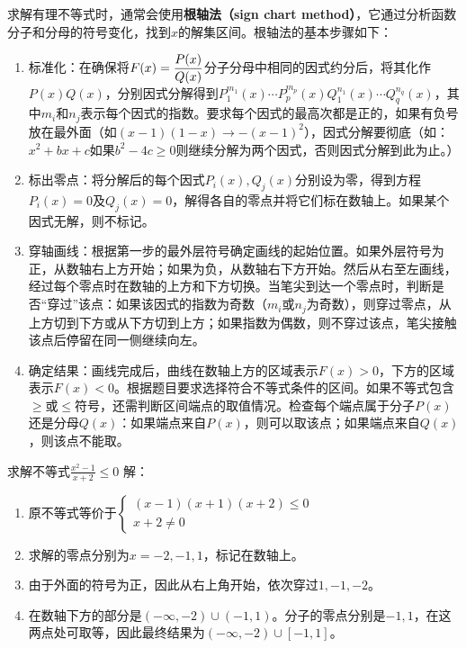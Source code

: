 求解有理不等式时，通常会使用\textbf{根轴法（sign chart method）}，它通过分析函数分子和分母的符号变化，找到$x$的解集区间。根轴法的基本步骤如下：
\begin{enumerate}
\item 标准化：在确保将$\displaystyle F(x)={P(x)\over Q(x)}$分子分母中相同的因式约分后，将其化作$P(x)Q(x)$，分别因式分解得到$P^{m_1}_1(x)\cdots P^{m_p}_p(x)Q^{n_1}_1(x)\cdots Q^{n_q}_q(x)$，其中$m_i$和$n_j$表示每个因式的指数。要求每个因式的最高次都是正的，如果有负号放在最外面（如$(x-1)(1-x)\to-(x-1)^2$），因式分解要彻底（如：$x^2+bx+c$如果$b^2-4c\geq0$则继续分解为两个因式，否则因式分解到此为止。）
\item 标出零点：将分解后的每个因式$P_i(x),Q_j(x)$分别设为零，得到方程$P_i(x) = 0$及$Q_j(x) = 0$，解得各自的零点并将它们标在数轴上。如果某个因式无解，则不标记。
\item 穿轴画线：根据第一步的最外层符号确定画线的起始位置。如果外层符号为正，从数轴右上方开始；如果为负，从数轴右下方开始。然后从右至左画线，经过每个零点时在数轴的上方和下方切换。当笔尖到达一个零点时，判断是否“穿过”该点：如果该因式的指数为奇数（$m_i$或$n_j$为奇数），则穿过零点，从上方切到下方或从下方切到上方；如果指数为偶数，则不穿过该点，笔尖接触该点后停留在同一侧继续向左。
\item 确定结果：画线完成后，曲线在数轴上方的区域表示$F(x) > 0$，下方的区域表示$F(x) < 0$。根据题目要求选择符合不等式条件的区间。如果不等式包含$\geq$或$\leq$符号，还需判断区间端点的取值情况。检查每个端点属于分子$P(x)$还是分母$Q(x)$：如果端点来自$P(x)$，则可以取该点；如果端点来自$Q(x)$，则该点不能取。
\end{enumerate}
\begin{example}{求解不等式$\displaystyle \frac{x^2 - 1}{x + 2} \leq 0$}
解：
\begin{enumerate}
\item 原不等式等价于$\begin{cases}(x-1)(x+1)(x+2)\leq0 \\ x+2\neq0\end{cases}$
\item 求解的零点分别为$x=-2,-1,1$，标记在数轴上。
\item 由于外面的符号为正，因此从右上角开始，依次穿过$1,-1,-2$。
\item 在数轴下方的部分是$(-\infty,-2)\cup(-1,1)$。分子的零点分别是$-1,1$，在这两点处可取等，因此最终结果为$(-\infty,-2)\cup[-1,1]$。
\end{enumerate}
\end{example}

